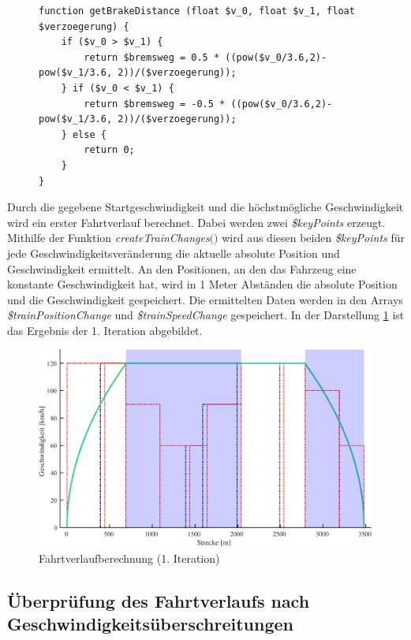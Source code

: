 \begin{figure}
\begin{lstlisting}[caption={\textit{getBrakeDistance$($$)$}},captionpos=b,label={lst:getBrakeDistance}]
function getBrakeDistance (float $v_0, float $v_1, float $verzoegerung) {
	if ($v_0 > $v_1) {
		return $bremsweg = 0.5 * ((pow($v_0/3.6,2)-pow($v_1/3.6, 2))/($verzoegerung));
	} if ($v_0 < $v_1) {
		return $bremsweg = -0.5 * ((pow($v_0/3.6,2)-pow($v_1/3.6, 2))/($verzoegerung));
	} else {
		return 0;
	}
}
\end{lstlisting}
\end{figure}

Durch die gegebene Startgeschwindigkeit und die höchstmögliche Geschwindigkeit wird ein erster Fahrtverlauf berechnet. Dabei werden zwei \textit{\$keyPoints} erzeugt. Mithilfe der Funktion \textit{createTrainChanges$($$)$} wird aus diesen beiden \textit{\$keyPoints} für jede Geschwindigkeitsveränderung die aktuelle absolute Position und Geschwindigkeit ermittelt. An den Positionen, an den das Fahrzeug eine konstante Geschwindigkeit hat, wird in 1 Meter Abständen die absolute Position und die Geschwindigkeit gespeichert. Die ermittelten Daten werden in den Arrays \textit{\$trainPositionChange} und \textit{\$trainSpeedChange} gespeichert. In der Darstellung \ref{fig:it3} ist das Ergebnis der 1. Iteration abgebildet.

\begin{figure}
  \includegraphics[width=\linewidth]{../matlab/it3.pdf}
  \caption{Fahrtverlaufberechnung (1. Iteration)}
  \label{fig:it3}
\end{figure}

\subsection{Überprüfung des Fahrtverlaufs nach Geschwindigkeitsüberschreitungen} \label{überprüfung}

